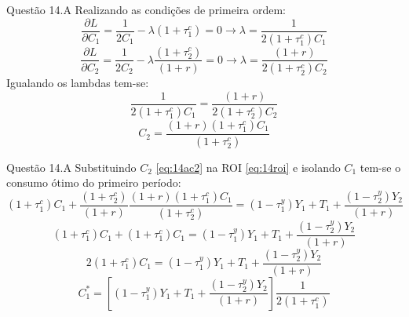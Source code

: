 \documentclass[aspectratio=169]{beamer}
\begin{document}
\begin{frame}{Questão 14.A}
Realizando as condições de primeira ordem:
\begin{equation}
    \frac{\partial L}{\partial C_1} = \frac{1}{2C_1} - \lambda(1+\tau_1^c) = 0 \to \lambda = \frac{1}{2(1+\tau_1^c)C_1}
\end{equation}
\begin{equation}
    \frac{\partial L}{\partial C_2} = \frac{1}{2C_2} - \lambda \frac{(1+\tau_2^c)}{(1+r)} = 0 \to \lambda = \frac{(1+r)}{2(1+\tau_2^c)C_2}
\end{equation}
Igualando os lambdas tem-se:
\begin{equation}
    \frac{1}{2(1+\tau_1^c)C_1} = \frac{(1+r)}{2(1+\tau_2^c)C_2}
\end{equation}
\begin{equation}\label{eq:14ac2}
    C_2 = \frac{(1+r)(1+\tau_1^c)C_1}{(1+\tau_2^c)}
\end{equation}
\end{frame}

\begin{frame}{Questão 14.A}
Substituindo $C_2$ \eqref{eq:14ac2} na ROI \eqref{eq:14roi} e isolando $C_1$ tem-se o consumo ótimo do primeiro período:
\begin{equation}
    (1+\tau_1^c)C_1 + \frac{(1+\tau_2^c)}{(1+r)}\frac{(1+r)(1+\tau_1^c)C_1}{(1+\tau_2^c)} = (1-\tau_1^y)Y_1 + T_1 + \frac{(1-\tau_2^y)Y_2}{(1+r)}
\end{equation}
\begin{equation}
    (1+\tau_1^c)C_1 + (1+\tau_1^c)C_1 = (1-\tau_1^y)Y_1 + T_1 + \frac{(1-\tau_2^y)Y_2}{(1+r)}
\end{equation}
\begin{equation}
    2(1+\tau_1^c)C_1 = (1-\tau_1^y)Y_1 + T_1 + \frac{(1-\tau_2^y)Y_2}{(1+r)}
\end{equation}
\begin{equation}\label{eq:14ac1star}
    C_1^* = \left[(1-\tau_1^y)Y_1 + T_1 + \frac{(1-\tau_2^y)Y_2}{(1+r)}\right]\frac{1}{2(1+\tau_1^c)}
\end{equation}
\end{frame}
\end{document}
